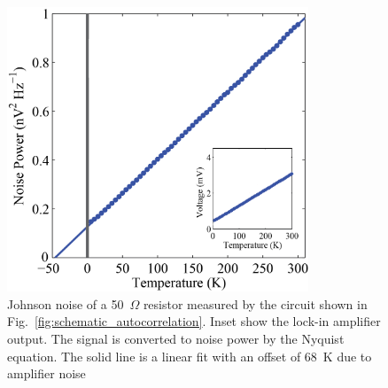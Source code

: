 \begin{figure}
\centering
\includegraphics[width = 90mm]{figures/Johnson_noise_thermometry/Auto_noise_vs_T.png}
\caption{Johnson noise of a 50~$\Omega$ resistor measured by the circuit shown in Fig.~\ref{fig:schematic_autocorrelation}. Inset show the lock-in amplifier output. The signal is converted to noise power by the Nyquist equation. The solid line is a linear fit with an offset of 68~K due to amplifier noise}
\label{fig:auto_noise_vs_T}
\end{figure}

